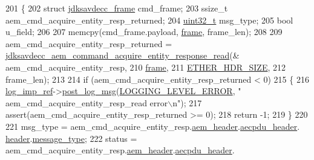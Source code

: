 \begin{DoxyCode}
201 \{
202     \textcolor{keyword}{struct }\hyperlink{structjdksavdecc__frame}{jdksavdecc\_frame} cmd\_frame;
203     ssize\_t aem\_cmd\_acquire\_entity\_resp\_returned;
204     \hyperlink{parse_8c_a6eb1e68cc391dd753bc8ce896dbb8315}{uint32\_t} msg\_type;
205     \textcolor{keywordtype}{bool} u\_field;
206 
207     memcpy(cmd\_frame.payload, \hyperlink{gst__avb__playbin_8c_ac8e710e0b5e994c0545d75d69868c6f0}{frame}, frame\_len);
208 
209     aem\_cmd\_acquire\_entity\_resp\_returned = 
      \hyperlink{group__command__acquire__entity__response_ga2eba02e65645b4bd3367333fe0c99df5}{jdksavdecc\_aem\_command\_acquire\_entity\_response\_read}(&
      aem\_cmd\_acquire\_entity\_resp,
210                                                                                                
      \hyperlink{gst__avb__playbin_8c_ac8e710e0b5e994c0545d75d69868c6f0}{frame},
211                                                                                                
      \hyperlink{namespaceavdecc__lib_a6c827b1a0d973e18119c5e3da518e65ca9512ad9b34302ba7048d88197e0a2dc0}{ETHER\_HDR\_SIZE},
212                                                                                                frame\_len);
213 
214     \textcolor{keywordflow}{if} (aem\_cmd\_acquire\_entity\_resp\_returned < 0)
215     \{
216         \hyperlink{namespaceavdecc__lib_acbe3e2a96ae6524943ca532c87a28529}{log\_imp\_ref}->\hyperlink{classavdecc__lib_1_1log_a68139a6297697e4ccebf36ccfd02e44a}{post\_log\_msg}(\hyperlink{namespaceavdecc__lib_a501055c431e6872ef46f252ad13f85cdaf2c4481208273451a6f5c7bb9770ec8a}{LOGGING\_LEVEL\_ERROR}, \textcolor{stringliteral}{"
      aem\_cmd\_acquire\_entity\_resp\_read error\(\backslash\)n"});
217         assert(aem\_cmd\_acquire\_entity\_resp\_returned >= 0);
218         \textcolor{keywordflow}{return} -1;
219     \}
220 
221     msg\_type = aem\_cmd\_acquire\_entity\_resp.\hyperlink{structjdksavdecc__aem__command__acquire__entity__response_ae1e77ccb75ff5021ad923221eab38294}{aem\_header}.\hyperlink{structjdksavdecc__aecpdu__aem_ae8460ae179666e7ce268ed1ef33d0de3}{aecpdu\_header}.
      \hyperlink{structjdksavdecc__aecpdu__common_a314cacb6a61bcf18749030c0b6fb7510}{header}.\hyperlink{structjdksavdecc__aecpdu__common__control__header_aeaaffeace8c23899e558022f62ce6de4}{message\_type};
222     status = aem\_cmd\_acquire\_entity\_resp.\hyperlink{structjdksavdecc__aem__command__acquire__entity__response_ae1e77ccb75ff5021ad923221eab38294}{aem\_header}.\hyperlink{structjdksavdecc__aecpdu__aem_ae8460ae179666e7ce268ed1ef33d0de3}{aecpdu\_header}.

\end{DoxyCode}
